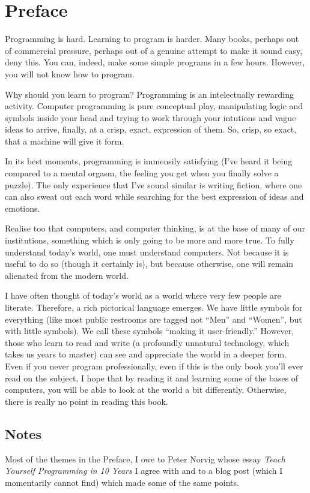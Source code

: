 \chapter*{Preface}

Programming is hard. Learning to program is harder. Many books, perhaps out of
commercial pressure, perhaps out of a genuine attempt to make it sound easy,
deny this. You can, indeed, make some simple programs in a few hours. However,
you will not know how to program.

Why should you learn to program? Programming is an intelectually rewarding
activity. Computer programming is pure conceptual play, manipulating logic and
symbols inside your head and trying to work through your intutions and vague
ideas to arrive, finally, at a crisp, exact, expression of them. So, crisp, so
exact, that a machine will give it form.

In its best moments, programming is immensily satisfying (I've heard it being
compared to a mental orgasm, the feeling you get when you finally solve a
puzzle). The only experience that I've sound similar is writing fiction, where
one can also sweat out each word while searching for the best expression of
ideas and emotions.

Realise too that computers, and computer thinking, is at the base of many of
our institutions, something which is only going to be more and more true. To
fully understand today's world, one must understand computers. Not because it
is useful to do so (though it certainly is), but because otherwise, one will
remain alienated from the modern world.

I have often thought of today's world as a world where very few people are
literate. Therefore, a rich pictorical language emerges. We have little symbols
for everything (like most public restrooms are tagged not ``Men'' and
``Women'', but with little symbols). We call these symbols ``making it
user-friendly.'' However, those who learn to read and write (a profoundly
unnatural technology, which takes us years to master) can see and appreciate
the world in a deeper form. Even if you never program professionally, even if
this is the only book you'll ever read on the subject, I hope that by reading
it and learning some of the bases of computers, you will be able to look at the
world a bit differently. Otherwise, there is really no point in reading this
book.

\section*{Notes}

Most of the themes in the Preface, I owe to Peter Norvig whose essay
\emph{Teach Yourself Programming in 10 Years} I agree with and to a blog post
(which I momentarily cannot find) which made some of the same points.

